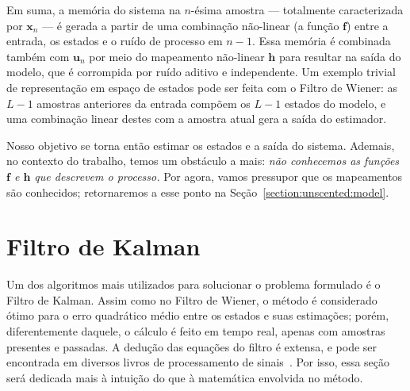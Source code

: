 Em suma, a memória do sistema na $n$-ésima amostra --- totalmente caracterizada por $\mathbf{x}_n$ --- é gerada a partir de uma combinação não-linear (a função $\mathbf{f}$) entre a entrada, os estados e o ruído de processo em $n-1$. Essa memória é combinada também com $\mathbf{u}_n$ por meio do mapeamento não-linear $\mathbf{h}$ para resultar na saída do modelo, que é corrompida por ruído aditivo e independente. Um exemplo trivial de representação em espaço de estados pode ser feita com o Filtro de Wiener: as $L - 1$ amostras anteriores da entrada compõem os $L - 1$ estados do modelo, e uma combinação linear destes com a amostra atual gera a saída do estimador.

Nosso objetivo se torna então estimar os estados e a saída do sistema. Ademais, no contexto do trabalho, temos um obstáculo a mais: \emph{não conhecemos as funções $\mathbf{f}$ e $\mathbf{h}$ que descrevem o processo.} Por agora, vamos pressupor que os mapeamentos são conhecidos; retornaremos a esse ponto na Seção~\ref{section:unscented:model}.

\section{Filtro de Kalman}

Um dos algoritmos mais utilizados para solucionar o problema formulado é o Filtro de Kalman. Assim como no Filtro de Wiener, o método é considerado ótimo para o erro quadrático médio entre os estados e suas estimações; porém, diferentemente daquele, o cálculo é feito em tempo real, apenas com amostras presentes e passadas. A dedução das equações do filtro é extensa, e pode ser encontrada em diversos livros de processamento de sinais~\cite{diniz-2020, hayes-1996}. Por isso, essa seção será dedicada mais à intuição do que à matemática envolvida no método.

